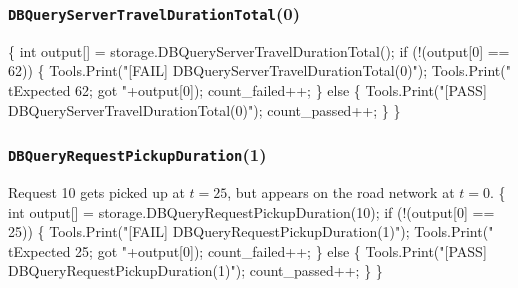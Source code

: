 \documentclass{article}
\def\nwendcode{\endtrivlist \endgroup}
\let\nwdocspar=\par
\begin{document}
\subsubsection{{\tt{}DBQueryServerTravelDurationTotal}(0)}
\nwenddocs{}\endmoddef{}
\{
  int output[] = storage.DBQueryServerTravelDurationTotal();
  if (!(output[0] == 62)) \{
    Tools.Print("[FAIL] DBQueryServerTravelDurationTotal(0)");
    Tools.Print("\\tExpected 62; got "+output[0]);
    count_failed++;
  \} else \{
    Tools.Print("[PASS] DBQueryServerTravelDurationTotal(0)");
    count_passed++;
  \}
\}
\nwendcode{}\nwdocspar
\subsubsection{{\tt{}DBQueryRequestPickupDuration}(1)}
Request 10 gets picked up at $t=25$, but appears on the road network at $t=0$.
\nwenddocs{}\endmoddef{}
\{
  int output[] = storage.DBQueryRequestPickupDuration(10);
  if (!(output[0] == 25)) \{
    Tools.Print("[FAIL] DBQueryRequestPickupDuration(1)");
    Tools.Print("\\tExpected 25; got "+output[0]);
    count_failed++;
  \} else \{
    Tools.Print("[PASS] DBQueryRequestPickupDuration(1)");
    count_passed++;
  \}
\}
\nwendcode{}\nwdocspar
\end{document}
